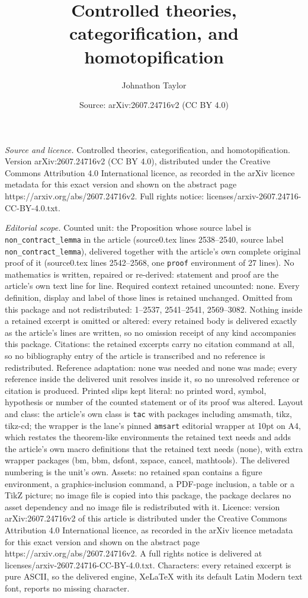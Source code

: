 \documentclass[10pt,a4paper]{amsart}
\title[Controlled theories, categorification, and homotopification]{Controlled theories, categorification, and homotopification}
\author{Johnathon Taylor}
\date{Source: arXiv:2607.24716v2 (CC BY 4.0)}
\begin{document}
\maketitle

\noindent\emph{Source and licence.} Controlled theories, categorification, and homotopification. Version arXiv:2607.24716v2 (CC BY 4.0), distributed under the Creative Commons Attribution 4.0 International licence, as recorded in the arXiv licence metadata for this exact version and shown on the abstract page https://arxiv.org/abs/2607.24716v2. Full rights notice: licenses/arxiv-2607.24716-CC-BY-4.0.txt.\par\smallskip

\noindent\textit{Editorial scope.} Counted unit: the Proposition whose source label is \texttt{non\_contract\_lemma} in the article (source0.tex lines 2538--2540, source label \texttt{non\_contract\_lemma}), delivered together with the article's own complete original proof of it (source0.tex lines 2542--2568, one \texttt{proof} environment of 27 lines). No mathematics is written, repaired or re-derived: statement and proof are the article's own text line for line. Required context retained uncounted: none. Every definition, display and label of those lines is retained unchanged. Omitted from this package and not redistributed: 1--2537, 2541--2541, 2569--3082. Nothing inside a retained excerpt is omitted or altered: every retained body is delivered exactly as the article's lines are written, so no omission receipt of any kind accompanies this package. Citations: the retained excerpts carry no citation command at all, so no bibliography entry of the article is transcribed and no reference is redistributed. Reference adaptation: none was needed and none was made; every reference inside the delivered unit resolves inside it, so no unresolved reference or citation is produced. Printed slips kept literal: no printed word, symbol, hypothesis or number of the counted statement or of its proof was altered. Layout and class: the article's own class is \texttt{tac} with packages including amsmath, tikz, tikz-cd; the wrapper is the lane's pinned \texttt{amsart} editorial wrapper at 10pt on A4, which restates the theorem-like environments the retained text needs and adds the article's own macro definitions that the retained text needs (none), with extra wrapper packages (bm, bbm, dsfont, xspace, cancel, mathtools). The delivered numbering is the unit's own. Assets: no retained span contains a figure environment, a graphics-inclusion command, a PDF-page inclusion, a table or a TikZ picture; no image file is copied into this package, the package declares no asset dependency and no image file is redistributed with it. Licence: version arXiv:2607.24716v2 of this article is distributed under the Creative Commons Attribution 4.0 International licence, as recorded in the arXiv licence metadata for this exact version and shown on the abstract page https://arxiv.org/abs/2607.24716v2. A full rights notice is delivered at licenses/arxiv-2607.24716-CC-BY-4.0.txt. Characters: every retained excerpt is pure ASCII, so the delivered engine, XeLaTeX with its default Latin Modern text font, reports no missing character.
\end{document}
